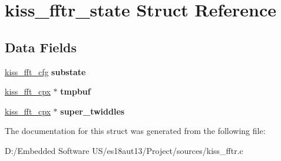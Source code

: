 \hypertarget{structkiss__fftr__state}{}\section{kiss\+\_\+fftr\+\_\+state Struct Reference}
\label{structkiss__fftr__state}
\subsection*{Data Fields}
\begin{DoxyCompactItemize}
\item 
\hypertarget{structkiss__fftr__state_acdccafcf502fec1c13450c2eae901738}{}\hyperlink{structkiss__fft__state}{kiss\+\_\+fft\+\_\+cfg} {\bfseries substate}\label{structkiss__fftr__state_acdccafcf502fec1c13450c2eae901738}

\item 
\hypertarget{structkiss__fftr__state_ae0b38b99d0ec7540abab4211093fdd99}{}\hyperlink{structkiss__fft__cpx}{kiss\+\_\+fft\+\_\+cpx} $\ast$ {\bfseries tmpbuf}\label{structkiss__fftr__state_ae0b38b99d0ec7540abab4211093fdd99}

\item 
\hypertarget{structkiss__fftr__state_ae612ac0806b0ceee4868f1829aa05e78}{}\hyperlink{structkiss__fft__cpx}{kiss\+\_\+fft\+\_\+cpx} $\ast$ {\bfseries super\+\_\+twiddles}\label{structkiss__fftr__state_ae612ac0806b0ceee4868f1829aa05e78}

\end{DoxyCompactItemize}


The documentation for this struct was generated from the following file\+:\begin{DoxyCompactItemize}
\item 
D\+:/\+Embedded Software U\+S/es18aut13/\+Project/sources/kiss\+\_\+fftr.\+c\end{DoxyCompactItemize}
